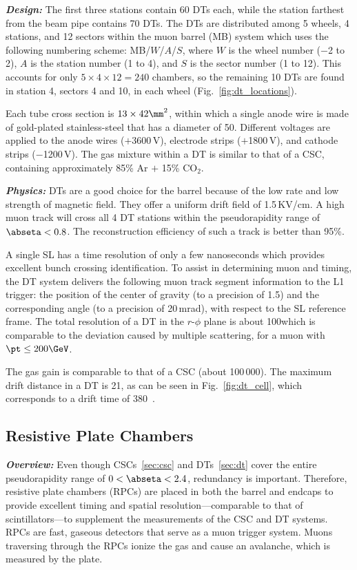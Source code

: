 \textbf{\textit{Design:}}
The first three stations contain 60 DTs each, while the station farthest from the beam pipe contains 70 DTs.
The DTs are distributed among 5 wheels, 4 stations, and 12 sectors within the muon barrel (MB) system which uses the following numbering scheme:
MB/$W$/$A$/$S$,
where $W$ is the wheel number ($-$2 to 2),
$A$ is the station number (1 to 4),
and $S$ is the sector number (1 to 12).
This accounts for only $5 \times 4 \times 12 = 240$ chambers, so the remaining 10 DTs are found in station 4, sectors 4 and 10, in each wheel (Fig.~\ref{fig:dt_locations}).

Each tube cross section is $13 \times 42\mm^{2}$, within which a single anode wire is made of gold-plated stainless-steel that has a diameter of 50\mum.
Different voltages are applied to the anode wires ($+$3600\,V), electrode strips ($+$1800\,V), and cathode strips ($-$1200\,V).
The gas mixture within a DT is similar to that of a CSC, containing approximately 85\% Ar $+$ 15\% CO$_{2}$.

\textbf{\textit{Physics:}}
DTs are a good choice for the barrel because of the low rate and low strength of magnetic field.
They offer a uniform drift field of 1.5\,KV/cm.
A high \pt muon track will cross all 4 DT stations within the pseudorapidity range of $\abseta < 0.8$.
The reconstruction efficiency of such a track is better than 95\%.

A single SL has a time resolution of only a few nanoseconds which provides excellent bunch crossing identification.
To assist in determining muon \pt and timing, the DT system delivers the following muon track segment information to the L1 trigger:
the position of the center of gravity (to a precision of 1.5\mm) and the corresponding angle (to a precision of 20\,mrad), with respect to the SL reference frame.
The total resolution of a DT in the $r$-$\phi$ plane is about 100\mum which is comparable to the deviation caused by multiple scattering, for a muon with $\pt \le 200\GeV$.

The gas gain is comparable to that of a CSC (about 100\,000).
The maximum drift distance in a DT is 21\mm, as can be seen in Fig.~\ref{fig:dt_cell}, which corresponds to a drift time of 380~\ns.

\subsection{Resistive Plate Chambers}
\label{sec:rpc}

\textbf{\textit{Overview:}}
Even though CSCs~\ref{sec:csc} and DTs~\ref{sec:dt} cover the entire pseudorapidity range of $0 < \abseta < 2.4$, redundancy is important.
Therefore, resistive plate chambers (RPCs) are placed in both the barrel and endcaps to provide excellent timing and spatial resolution---comparable to that of scintillators---to supplement the measurements of the CSC and DT systems.
RPCs are fast, gaseous detectors that serve as a muon trigger system.
Muons traversing through the RPCs ionize the gas and cause an avalanche, which is measured by the plate.

